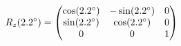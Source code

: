 \documentclass[preview]{standalone}
\begin{document}
\begin{align*}
\special{dvisvgm:raw <g id='unique000'>}R_z(2.2^\circ) = \begin{pmatrix} \cos(2.2^\circ) & -\sin(2.2^\circ) & 0 \\ \sin(2.2^\circ) & \cos(2.2^\circ) & 0 \\ 0 & 0 & 1 \end{pmatrix}\special{dvisvgm:raw </g>}
\end{align*}
\end{document}
